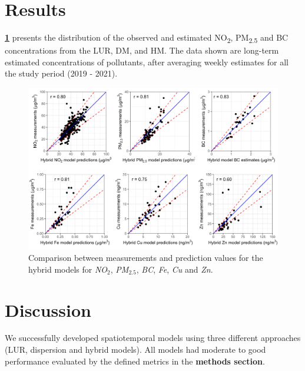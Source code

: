 \documentclass{article}
\begin{document}
\newpage
\section{Results}

\textbf{\cref{fig2}} presents the distribution of the observed and estimated NO\textsubscript{2}, PM\textsubscript{2.5} and BC concentrations from the LUR, DM, and HM. The data shown are long-term estimated concentrations of pollutants, after averaging weekly estimates for all the study period (2019 - 2021).   


\captionsetup[figure]{skip=6pt}
\begin{figure}[!htb]
\includegraphics[width=1.0\textwidth]{figures/fig_HM_test_all_models.png}
\caption{Comparison between measurements and prediction values for the hybrid models for \textit{NO$_2$}, \textit{PM$_{2.5}$}, \textit{BC}, \textit{Fe}, \textit{Cu} and \textit{Zn}.}
\label{fig2}
\end{figure}

\section{Discussion}
We successfully developed spatiotemporal models using three different approaches (LUR, dispersion and hybrid models). All models had moderate to good performance evaluated by the defined metrics in the \textbf{methods section}.
\end{document}

